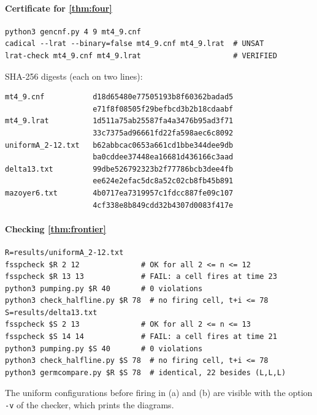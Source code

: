 \paragraph{Certificate for \cref{thm:four}}
{\footnotesize
\begin{verbatim}
python3 gencnf.py 4 9 mt4_9.cnf
cadical --lrat --binary=false mt4_9.cnf mt4_9.lrat  # UNSAT
lrat-check mt4_9.cnf mt4_9.lrat                     # VERIFIED
\end{verbatim}}
SHA-256 digests (each on two lines):
{\footnotesize
\begin{verbatim}
mt4_9.cnf           d18d65480e77505193b8f60362badad5
                    e71f8f08505f29befbcd3b2b18cdaabf
mt4_9.lrat          1d511a75ab25587fa4a3476b95ad3f71
                    33c7375ad96661fd22fa598aec6c8092
uniformA_2-12.txt   b62abbcac0653a661cd1bbe344dee9db
                    ba0cddee37448ea16681d436166c3aad
delta13.txt         99dbe526792323b2f77786bcb3dee4fb
                    ee624e2efac5dc8a52c02cb8fb45b891
mazoyer6.txt        4b0717ea7319957c1fdcc887fe09c107
                    4cf338e8b849cdd32b4307d0083f417e
\end{verbatim}}

\paragraph{Checking \cref{thm:frontier}}
{\footnotesize
\begin{verbatim}
R=results/uniformA_2-12.txt
fsspcheck $R 2 12              # OK for all 2 <= n <= 12
fsspcheck $R 13 13             # FAIL: a cell fires at time 23
python3 pumping.py $R 40       # 0 violations
python3 check_halfline.py $R 78  # no firing cell, t+i <= 78
S=results/delta13.txt
fsspcheck $S 2 13              # OK for all 2 <= n <= 13
fsspcheck $S 14 14             # FAIL: a cell fires at time 21
python3 pumping.py $S 40       # 0 violations
python3 check_halfline.py $S 78  # no firing cell, t+i <= 78
python3 germcompare.py $R $S 78  # identical, 22 besides (L,L,L)
\end{verbatim}}
The uniform configurations before firing in (a) and (b) are visible with
the option \texttt{-v} of the checker, which prints the diagrams.

